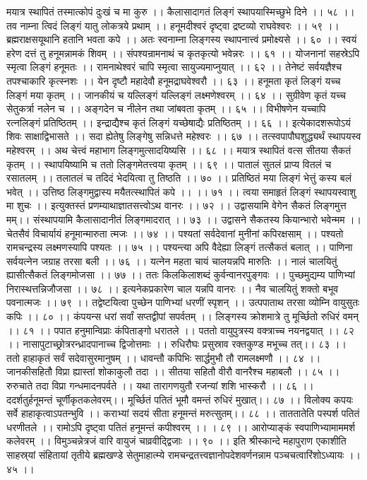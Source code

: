 मयात्र स्थापितं तस्मात्कोपं दुःखं च मा कुरु ।।
कैलासादागतं लिङ्गं स्थापयास्मिच्छुभे दिने ।। ५८ ।।
तव नाम्ना त्विदं लिङ्गं यातु लोकत्रये प्रथाम् ।।
हनूमदीश्वरं दृष्ट्वा द्रष्टव्यो राघवेश्वरः ।। ५९ ।।
ब्रह्मराक्षसयूथानि हतानि भवता कपे ।।
अतः स्वनाम्ना लिङ्गस्य स्थापनात्त्वं प्रमोक्ष्यसे ।। ६० ।।
स्वयं हरेण दत्तं तु हनूमन्नामकं शिवम् ।।
संपश्यन्रामनाथं च कृतकृत्यो भवेन्नरः ।। ६१ ।।
योजनानां सहस्रेऽपि स्मृत्वा लिङ्गं हनूमतः ।।
रामनाथेश्वरं चापि स्मृत्वा सायुज्यमाप्नुयात् ।। ६२ ।।
तेनेष्टं सर्वयज्ञैश्च तपश्चाकारि कृत्स्नशः ।।
येन दृष्टौ महादेवौ हनूमद्राघवेश्वरौ ।। ६३ ।।
हनूमता कृतं लिङ्गं यच्च लिङ्गं मया कृतम् ।।
जानकीयं च यल्लिङ्गं यल्लिङ्गं लक्ष्मणेश्वरम् ।। ६४ ।।
सुग्रीवेण कृतं यच्च सेतुकर्त्रा नलेन च ।।
अङ्गदेन च नीलेन तथा जांबवता कृतम् ।। ६५ ।।
विभीषणेन यच्चापि रत्नलिङ्गं प्रतिष्ठितम् ।।
इन्द्राद्यैश्च कृतं लिङ्गं यच्छेषाद्यैः प्रतिष्ठितम् ।। ६६ ।।
इत्येकादशरूपोऽयं शिवः साक्षाद्विभासते ।।
सदा ह्येतेषु लिङ्गेषु सन्निधत्ते महेश्वरः ।। ६७ ।।
तत्स्वपापौघशुद्ध्यर्थं स्थापयस्व महेश्वरम् ।।
अथ चेत्त्वं महाभाग लिङ्गमुत्सादयिष्यसि ।। ६८ ।।
मयात्र स्थापितं वत्स सीतया सैकतं कृतम् ।।
स्थापयिष्यामि च ततो लिङ्गमेतत्त्वया कृतम् ।। ६९ ।।
पातालं सुतलं प्राप्य वितलं च रसातलम् ।।
तलातलं च तदिदं भेदयित्वा तु तिष्ठति ।। ७० ।।
प्रतिष्ठितं मया लिङ्गं भेत्तुं कस्य बलं भवेत् ।।
उत्तिष्ठ लिङ्गमुद्वास्य मयैतत्स्थापितं कपे ।। ।। ७१ ।।
त्वया समाहृतं लिङ्गं स्थापयस्वाशु मा शुचः ।।
इत्युक्तस्तं प्रणम्याथाज्ञातसत्त्वोऽथ वानरः ।। ७२ ।।
उद्वासयामि वेगेन सैकतं लिङ्गमुत्त मम्।।
संस्थापयामि कैलासादानीतं लिङ्गमादरात् ।। ७३ ।।
उद्वासने सैकतस्य कियान्भारो भवेन्मम ।।
चेतसैवं विचार्यायं हनूमान्मारुता त्मजः ।। ७४ ।।
पश्यतां सर्वदेवानां मुनीनां कपिरक्षसाम् ।।
पश्यतो रामचन्द्रस्य लक्ष्मणस्यापि पश्यतः ।। ७५ ।।
पश्यन्त्या अपि वैदेह्या लिङ्गं तत्सैकतं बलात् ।।
पाणिना सर्वयत्नेन जग्राह तरसा बली ।। ७६ ।।
यत्नेन महता चायं चालयन्नपि मारुतिः ।।
नालं चालयितुं ह्यासीत्सैकतं लिङ्गमोजसा ।। ७७ ।।
ततः किलकिलाशब्दं कुर्वन्वानरपुङ्गवः ।।
पुच्छमुद्यम्य पाणिभ्यां निरास्थत्तन्निजौजसा ।। ७८ ।।
इत्यनेकप्रकारेण चाल यन्नपि वानरः ।।
नैव चालयितुं शक्तो बभूव पवनात्मजः ।। ७९ ।।
तद्वेष्टयित्वा पुच्छेन पाणिभ्यां धरणीं स्पृशन् ।।
उत्पपाताथ तरसा व्योम्नि वायुसुतः कपिः ।। ८० ।।
कंपयन्स धरां सर्वां सप्तद्वीपां सपर्वतम् ।।
लिङ्गस्य क्रोशमात्रे तु मूर्च्छितो रुधिरं वमन् ।। ८१ ।।
पपात हनुमान्विप्राः कंपिताङ्गो धरातले ।।
पततो वायुपुत्रस्य वक्त्राच्च नयनद्वयात् ।। ८२ ।।
नासापुटाच्छ्रोत्ररन्ध्रादपानाच्च द्विजोत्तमाः ।।
रुधिरौघः प्रसुस्राव रक्तकुण्ड मभूच्च तत्।। ८३ ।।
ततो हाहाकृतं सर्वं सदेवासुरमानुषम् ।।
धावन्तौ कपिभिः सार्द्धमुभौ तौ रामलक्ष्मणौ ।। ८४ ।।
जानकीसहितौ विप्रा ह्यास्तां शोकाकुलौ तदा ।।
सीतया सहितौ वीरौ वानरैश्च महाबलौ ।। ८५ ।।
रुरुचाते तदा विप्रा गन्धमादनपर्वते ।।
यथा तारागणयुतौ रजन्यां शशि भास्करौ ।। ८६ ।।
ददर्शतुर्हनूमन्तं चूर्णीकृतकलेवरम्।।
मूर्च्छितं पतितं भूमौ वमन्तं रुधिरं मुखात्।। ८७ ।।
विलोक्य कपयः सर्वे हाहाकृत्वाऽपतन्भुवि ।।
कराभ्यां सदयं सीता हनूमन्तं मरुत्सुतम्।। ८८ ।।
ताततातेति पस्पर्श पतितं धरणीतले ।।
रामोऽपि दृष्ट्वा पतितं हनूमन्तं कपीश्वरम् ।। । ८९ ।।
आरोप्याङ्कं स्वपाणिभ्यामाममर्श कलेवरम् ।।
विमुञ्चन्नेत्रजं वारि वायुजं चाव्रवीद्द्विजाः ।। ९० ।।
इति श्रीस्कान्दे महापुराण एकाशीति साहस्र्यां संहितायां तृतीये ब्रह्मखण्डे सेतुमाहात्म्ये रामचन्द्रतत्त्वज्ञानोपदेशवर्णनन्नाम पञ्चचत्वारिंशोऽध्यायः ।। ४५ ।।



